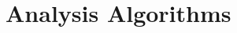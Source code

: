 \section{Analysis Algorithms}\label{app:algo}

\begin{comment}
\begin{table}[!h]
\begin{tabular}{|l|l|}
\hline
\textbf{Symbols}				&	\textbf{Description}								\\ \hline
$\mathit{D}$					&	$\mathit{Var} \rightarrow 2^\mathit{Inst}$			\\
								&	Analysis dataflow set 								\\ \hline
$\mathit{Proc}$					&	Set of all program functions and procedures 		\\ \hline
$\mathit{Inst}$					&	Set of instructions in the program 					\\ \hline
$\mathit{IN}$				&	$\mathit{Inst}\ \rightarrow\ \mathit{D}$ 			\\
								&	Function that returns the dataflow values			\\
		    					&	at the program point before an instruction 			\\ 	\hline
$\mathit{OUT}$				&	$\mathit{Inst}\ \rightarrow\ \mathit{D}$ 			\\
								&	Function that returns the dataflow values			\\
		    					&	at the program point after an instruction 			\\ 	\hline	    		
$\mathit{worklist}$				&	Set of remaining instructions to be processed 		\\ \hline
$\mathit{InterFlow}$					&	$\mathit{Inst}\ \rightarrow\ \mathit{D}$ 			\\
								&   Analysis flow function (Algorithm~\ref{fig:algoFlow}) 			\\ \hline
$\mathit{first}$				&	$\mathit{Func} \rightarrow\ \mathit{Inst}$ 			\\
								& 	Function that returns the first instruction			\\
								&	of a procedure										\\ \hline
$\mathit{next}$					&	$\mathit{worklist}\ \rightarrow\ \mathit{Inst}$ 	\\
								& 	Function that returns the next instructions			\\
								&	from the worklist									\\ \hline
$\mathit{formal}$				&	$\mathit{Proc}\ \times \mathit{Var} \rightarrow\ \mathit{Var}$ 	\\

\end{comment}
